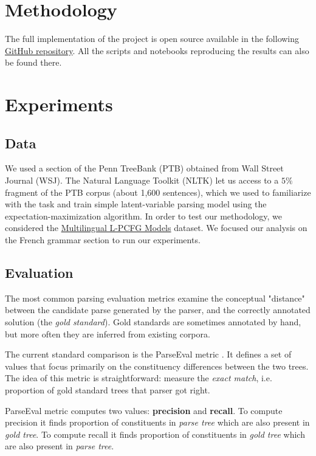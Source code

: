 \documentclass[conference]{IEEEtran}
\begin{document}
\section{Methodology}

The full implementation of the project is open source available in the following  \href{https://github.com/divserge/pcfg_parser}{GitHub repository}. All the scripts and notebooks reproducing the results can also be found there.


\section{Experiments}
\subsection{Data}

We used a section of the Penn TreeBank (PTB) \cite{IEEEhowto:marcus} obtained from Wall Street Journal (WSJ). The Natural Language Toolkit (NLTK) let us access to a $5\%$ fragment of the PTB corpus (about 1,600 sentences), which we used to familiarize with the task and train simple latent-variable parsing model using the expectation-maximization algorithm. In order to test our methodology, we considered the  \href{http://cohort.inf.ed.ac.uk/lpcfg.html}{Multilingual L-PCFG Models} dataset. We focused our analysis on the French grammar section to run our experiments.


\subsection{Evaluation}
The most common parsing evaluation metrics examine the conceptual "distance" between the candidate parse generated by the parser, and the correctly annotated solution (the \textit{gold standard}). Gold standards are sometimes annotated by hand, but more often they are inferred from existing corpora.

The current standard comparison is the ParseEval metric \cite{IEEEhowto:Black}. It defines a set of values that focus primarily on the constituency differences between the two trees. The idea of this metric is straightforward: measure the \textit{exact match}, i.e. proportion of gold standard trees that parser got right. 

ParseEval metric computes two values: \textbf{precision} and \textbf{recall}. 
To compute precision it finds proportion of constituents in \textit{parse tree} which are also present in \textit{gold tree}.
To compute recall it finds proportion of constituents in \textit{gold tree} which are also present in \textit{parse tree}.
\end{document}
